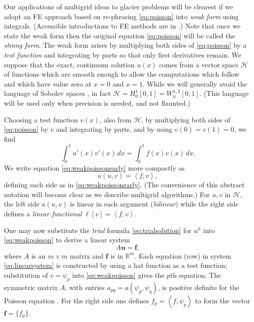 \documentclass[letterpaper,final,12pt,reqno]{amsart}
\newcommand{\RR}{\mathbb{R}}
\newcommand{\bbf}{\mathbf{f}}
\newcommand{\bu}{\mathbf{u}}
\newcommand{\ip}[2]{\left<#1,#2\right>}
\numberwithin{equation}{section}
\numberwithin{figure}{section}
\numberwithin{table}{section}
\begin{document}
Our applications of multigrid ideas to glacier problems will be clearest if we adopt an FE approach based on re-phrasing \eqref{eq:poisson} into \emph{weak form} using integrals.  (Accessible introductions to FE methods are in \cite{Bueler2021,Elmanetal2014,Johnson2009}.)  Note that once we state the weak form then the original equation \eqref{eq:poisson} will be called the \emph{strong form}.  The weak form arises by multiplying both sides of \eqref{eq:poisson} by a \emph{test function} and integrating by parts so that only first derivatives remain.  We suppose that the exact, continuum solution $u(x)$ comes from a vector space $\mathcal{H}$ of functions which are smooth enough to allow the computations which follow and which have value zero at $x=0$ and $x=1$.  While we will generally avoid the language of Sobolev spaces \cite[for example]{Evans2010}, in fact $\mathcal{H}=H_0^1[0,1]=W_0^{1,2}[0,1]$.  (This language will be used only when precision is needed, and not flaunted.)

Choosing a test function $v(x)$, also from $\mathcal{H}$, by multiplying both sides of \eqref{eq:poisson} by $v$ and integrating by parts, and by using $v(0)=v(1)=0$, we find
\begin{equation}
\int_0^1 u'(x) v'(x)\,dx = \int_0^1 f(x) v(x)\, dx.  \label{eq:weakpoissonearly}
\end{equation}
We write equation \eqref{eq:weakpoissonearly} more compactly as
\begin{equation}
  a(u,v) = \ip{f}{v}, \label{eq:weakpoisson}
\end{equation}
defining each side as in \eqref{eq:weakpoissonearly}.  (The convenience of this abstract notation will become clear as we describe multigrid algorithms.)  For $u,v$ in $\mathcal{H}$, the left side $a(u,v)$ is linear in each argument (\emph{bilinear}) while the right side defines a \emph{linear functional} $\ell[v] = \ip{f}{v}$.

One may now substitute the \emph{trial} formula \eqref{eq:trialsolution} for $u^h$ into \eqref{eq:weakpoisson} to derive a linear system
\begin{equation}
A \bu = \bbf, \label{eq:linearsystem}
\end{equation}
where $A$ is an $m\times m$ matrix and $\bbf$ is in $\RR^m$.  Each equation (row) in system \eqref{eq:linearsystem} is constructed by using a hat function as a test function; substitution of $v=\psi_p$ into \eqref{eq:weakpoisson} gives the $p$th equation.  The symmetric matrix $A$, with entries $a_{pq} = a(\psi_p,\psi_q)$, is positive definite for the Poisson equation \cite{Elmanetal2014}.  For the right side one defines $f_p = \ip{f}{\psi_p}$ to form the vector $\bbf = \{f_p\}$.
\end{document}
